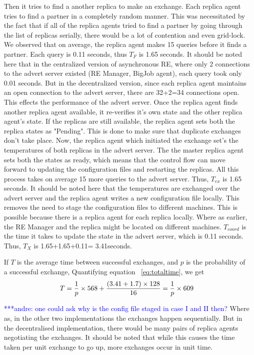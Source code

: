 \documentclass{rspublic}
\newcommand{\alnote}[1]{ {\textcolor{blue} { ***andre: #1 }}}
\newcommand{\alnote}[1]{}
\begin{document}
Then it tries to find a another replica to make an exchange. Each replica agent tries to find a partner in a completely random manner. This was necessitated by the fact that if all of the replica agents tried to find a partner by going through the list of replicas serially, there would be a lot of contention and even grid-lock. We observed that on average, the replica agent makes 15 queries before it finds a partner. Each query is 0.11 seconds, thus $T_F$ is 1.65 seconds. It should be noted here that in the centralized version of asynchronous RE, where only 2 connections to the advert server existed (RE Manager, BigJob agent), each query took only 0.01 seconds. But in the decentralized version, since each replica agent maintains an open connection to the advert server, there are 32+2=34 connections open. This effects the performance of the advert server. Once the replica agent finds another replica agent available, it re-verifies it's own state and the other replica agent's state. If the replicas are still available, the replica agent sets both the replica states as "Pending". This is done to make sure that duplicate exchanges don't take place. Now, the replica agent which initiated the exchange set's the temperatures of both replicas in the advert server. The the master replica agent sets both the states as ready, which means that the control flow can move forward to updating the configuration files and restarting the replicas. All this process takes on average 15 more queries to the advert server. Thus, $T_{ex}$ is 1.65 seconds. It should be noted here that the temperatures are exchanged over the advert server and the replica agent writes a new configuration file locally. This removes the need to stage the configuration files to different machines. This is possible because there is a replica agent for each replica locally. Where as earlier, the RE Manager and the replica might be located on different machines. $T_{coord}$ is the time it takes to update the state in the advert server, which is 0.11 seconds. Thus, $T_X$ is 1.65+1.65+0.11= 3.41seconds. 


If $T$ is the average time between successful exchanges, and $p$ is the probability of a successful exchange, 
Quantifying equation ~\ref{eq:totaltime}, we get
\begin{eqnarray}
T=  {1 \over p} \times {568 + {(3.41+1.7)\times 128\over 16}} = {1 \over p} \times 609
\label{eq:timebt}
\end{eqnarray}




\alnote {one could ask why is the 
config file staged in case I and II then?} 
Where as, in the other two implementations the exchanges happen sequentially. But in the decentralised implementation, there would be many pairs of replica agents negotiating the exchanges. It should be noted that while this causes the time taken per unit exchange to go up, more exchanges occur in unit time. 
\end{document}
